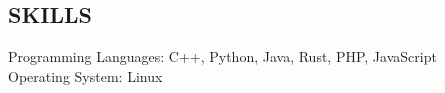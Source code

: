 \documentclass[mm, 7pt]{resume} %
\begin{document}
\begin{resume}
\section{SKILLS}

Programming Languages:             \hfill  C++, Python, Java, Rust, PHP, JavaScript  \\
Operating System:     \hfill  Linux \\

\end{resume}
\end{document}
